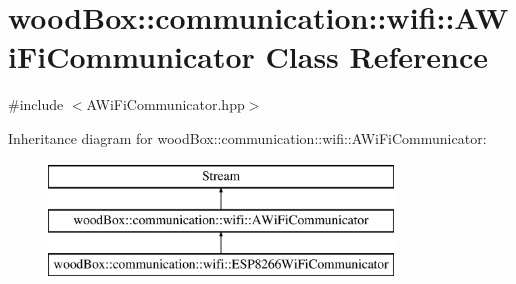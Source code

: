 \hypertarget{classwood_box_1_1communication_1_1wifi_1_1_a_wi_fi_communicator}{}\section{wood\+Box\+:\+:communication\+:\+:wifi\+:\+:A\+Wi\+Fi\+Communicator Class Reference}
\label{classwood_box_1_1communication_1_1wifi_1_1_a_wi_fi_communicator}


{\ttfamily \#include $<$A\+Wi\+Fi\+Communicator.\+hpp$>$}

Inheritance diagram for wood\+Box\+:\+:communication\+:\+:wifi\+:\+:A\+Wi\+Fi\+Communicator\+:\begin{figure}[H]
\begin{center}
\leavevmode
\includegraphics[height=3.000000cm]{classwood_box_1_1communication_1_1wifi_1_1_a_wi_fi_communicator}
\end{center}
\end{figure}
